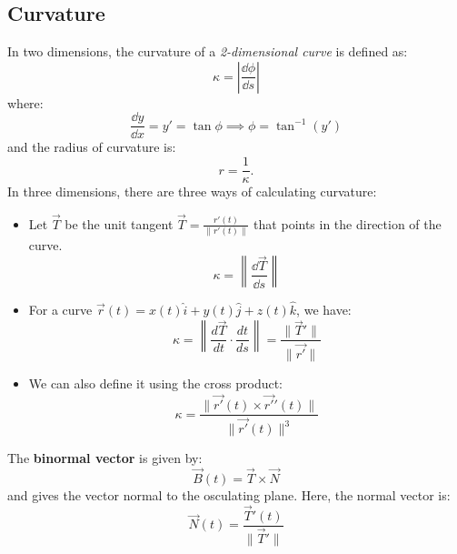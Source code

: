\documentclass{article}
\begin{document}
    \subsection{Curvature}
    In two dimensions, the curvature of a \textit{2-dimensional curve} is defined as:
        \begin{equation}
            \kappa = \left|\frac{\dd{\phi}}{\dd{s}}\right|
        \end{equation}
        where:
        \begin{equation}
            \frac{\dd{y}}{\dd{x}}=y'=\tan\phi \implies \phi = \tan^{-1}(y')
        \end{equation}
        and the radius of curvature is:
        \begin{equation}
            r = \frac{1}{\kappa}.
        \end{equation}
        In three dimensions, there are three ways of calculating curvature:
        \begin{itemize}
            \item Let $\vec{T}$ be the unit tangent $\vec{T}=\frac{r'(t)}{\lVert r'(t)\rVert}$ that points in the direction of the curve.
            \begin{equation}
                \kappa = \left\lVert \frac{\dd{\vec{T}}}{\dd{s}}\right\rVert
            \end{equation}
            \item For a curve $\vec{r}(t) = x(t)\hat{i} + y(t)\hat{j} + z(t) \hat{k}$, we have:
            \begin{equation}
                \kappa = \left\lVert \frac{d\vec{T}}{dt} \cdot \frac{dt}{ds}\right\rVert = \frac{\lVert \vec{T}' \rVert}{\lVert \vec{r'} \rVert}
            \end{equation}
            \item We can also define it using the cross product:
            \begin{equation}
                \kappa = \frac{\lVert \vec{r'}(t) \times \vec{r'}'(t)\rVert}{\lVert\vec{r'}(t)\rVert^3}
            \end{equation}
        \end{itemize}
        The \textbf{binormal vector} is given by:
        \begin{equation}
            \vec{B}(t) = \vec{T} \times \vec{N}
        \end{equation}
        and gives the vector normal to the osculating plane. Here, the normal vector is:
        \begin{equation}
            \vec{N}(t) = \frac{\vec{T}'(t)}{\lVert \vec{T}'\rVert}
        \end{equation}
\end{document}
